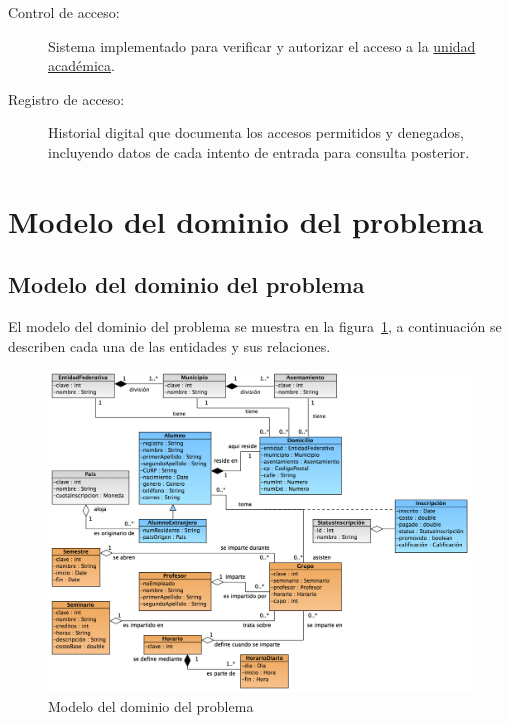 \begin{description}
	\item[\hypertarget{tControlAcceso}{Control de acceso:}] Sistema implementado para verificar y autorizar el acceso a la \hyperlink{tUnidadAcademica}{unidad académica}.
	
	\item[\hypertarget{tRegistroAcceso}{Registro de acceso:}] Historial digital que documenta los accesos permitidos y denegados, incluyendo datos de cada intento de entrada para consulta posterior.
	
\end{description}
\section{Modelo del dominio del problema}
\label{sec:terminosDeNegocio}
\subsection{Modelo del dominio del problema}

El modelo del dominio del problema se muestra en la figura~\ref{fig:modeloDeDominio}, a continuación se describen cada una de las entidades y sus relaciones.

\begin{figure}[htbp!]
	\begin{center}
		\includegraphics[angle=90,width=.95\textwidth]{images/modeloDelDominioDelProblema}
		\caption{Modelo del dominio del problema}
		\label{fig:modeloDeDominio}
	\end{center}
\end{figure}

